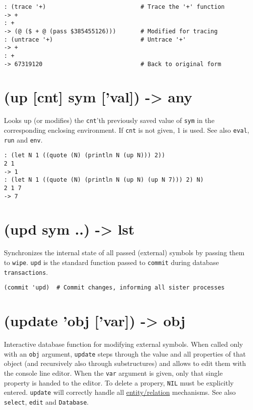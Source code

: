 {{{{{{{{\begin{verbatim}
: (trace '+)                           # Trace the '+' function
-> +
: +
-> (@ ($ + @ (pass $385455126)))       # Modified for tracing
: (untrace '+)                         # Untrace '+'
-> +
: +
-> 67319120                            # Back to original form
\end{verbatim}

 
\section{(up [cnt] sym ['val]) -> any}
\label{sec-8-1-21-14}


Looks up (or modifies) the \texttt{cnt}'th previously saved value of \texttt{sym} in
the corresponding enclosing environment. If \texttt{cnt} is not given, 1 is
used. See also \texttt{eval}, \texttt{run} and \texttt{env}.


\begin{verbatim}
: (let N 1 ((quote (N) (println N (up N))) 2))
2 1
-> 1
: (let N 1 ((quote (N) (println N (up N) (up N 7))) 2) N)
2 1 7
-> 7
\end{verbatim}

 
\section{(upd sym ..) -> lst}
\label{sec-8-1-21-15}


Synchronizes the internal state of all passed (external) symbols by
passing them to \texttt{wipe}. \texttt{upd} is the standard function passed to
\texttt{commit} during database \texttt{transactions}.


\begin{verbatim}
(commit 'upd)  # Commit changes, informing all sister processes
\end{verbatim}

 
\section{(update 'obj ['var]) -> obj}
\label{sec-8-1-21-16}


Interactive database function for modifying external symbols. When
called only with an \texttt{obj} argument, \texttt{update} steps through the value and
all properties of that object (and recursively also through
substructures) and allows to edit them with the console line editor.
When the \texttt{var} argument is given, only that single property is handed to
the editor. To delete a propery, \texttt{NIL} must be explicitly entered.
\texttt{update} will correctly handle all \hyperref[ref.html-er]{entity/relation}
mechanisms. See also \texttt{select}, \texttt{edit} and \texttt{Database}.


}}}}}}}}
